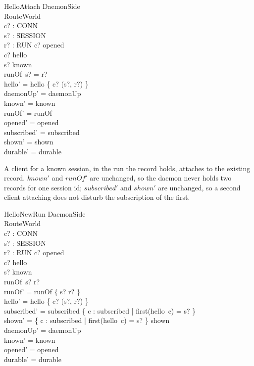 \documentclass[a4paper,10pt,fleqn]{article}
\begin{document}
\begin{schema}{HelloAttach}
  \Delta DaemonSide \\
  \Xi RouteWorld \\
  c? : CONN \\
  s? : SESSION \\
  r? : RUN
  \where
  c? \in opened \\
  c? \notin \dom hello \\
  s? \in known \\
  runOf~s? = r? \\
  hello' = hello \cup \{ c? \mapsto (s?, r?) \} \\
  daemonUp' = daemonUp \\
  known' = known \\
  runOf' = runOf \\
  opened' = opened \\
  subscribed' = subscribed \\
  shown' = shown \\
  durable' = durable
\end{schema}

A client for a known session, in the run the record holds, attaches to the
existing record.  $known'$ and $runOf'$ are unchanged, so the daemon never
holds two records for one session id; $subscribed'$ and $shown'$ are
unchanged, so a second client attaching does not disturb the subscription
of the first.

\begin{schema}{HelloNewRun}
  \Delta DaemonSide \\
  \Xi RouteWorld \\
  c? : CONN \\
  s? : SESSION \\
  r? : RUN
  \where
  c? \in opened \\
  c? \notin \dom hello \\
  s? \in known \\
  runOf~s? \neq r? \\
  runOf' = runOf \oplus \{ s? \mapsto r? \} \\
  hello' = hello \cup \{ c? \mapsto (s?, r?) \} \\
  subscribed' = subscribed \setminus
    \{ c : subscribed | first(hello~c) = s? \} \\
  shown' = \{ c : subscribed | first(hello~c) = s? \} \ndres shown \\
  daemonUp' = daemonUp \\
  known' = known \\
  opened' = opened \\
  durable' = durable
\end{schema}
\end{document}
